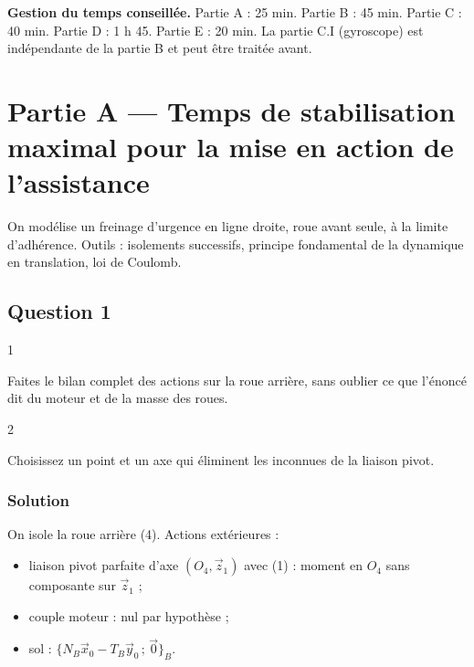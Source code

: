 \documentclass[11pt,a4paper]{article}
\providecommand{\tightlist}{\setlength{\itemsep}{0pt}\setlength{\parskip}{0pt}}
\begin{document}
\textbf{Gestion du temps conseillée.} Partie A : 25 min. Partie B : 45 min. Partie C : 40 min. Partie D : 1 h 45. Partie E : 20 min. La partie C.I (gyroscope) est indépendante de la partie B et peut être traitée avant.

\hypertarget{partie-a-temps-de-stabilisation-maximal-pour-la-mise-en-action-de-lassistance}{%
\section{Partie A --- Temps de stabilisation maximal pour la mise en action de l'assistance}\label{partie-a-temps-de-stabilisation-maximal-pour-la-mise-en-action-de-lassistance}}

On modélise un freinage d'urgence en ligne droite, roue avant seule, à la limite d'adhérence. Outils : isolements successifs, principe fondamental de la dynamique en translation, loi de Coulomb.

\hypertarget{question-1}{%
\subsection{Question 1}\label{question-1}}

\begin{indication}{1}

Faites le bilan complet des actions sur la roue arrière, sans oublier ce que l'énoncé dit du moteur et de la masse des roues.

\end{indication}

\begin{indication}{2}

Choisissez un point et un axe qui éliminent les inconnues de la liaison pivot.

\end{indication}

\hypertarget{solution}{%
\subsubsection{Solution}\label{solution}}

On isole la roue arrière (4). Actions extérieures :

\begin{itemize}
\tightlist
\item
  liaison pivot parfaite d'axe \((O_4,\vec z_1)\) avec (1) : moment en \(O_4\) sans composante sur \(\vec z_1\) ;
\item
  couple moteur : nul par hypothèse ;
\item
  sol : \(\{N_B\vec x_0-T_B\vec y_0\,;\,\vec0\}_B\).
\end{itemize}
\end{document}
